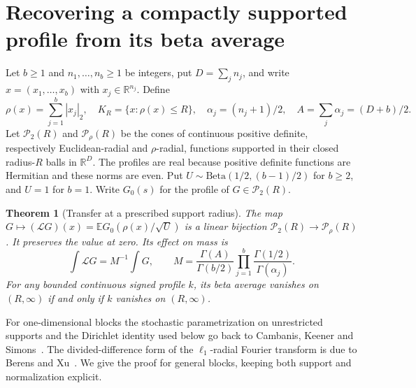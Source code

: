 \documentclass[11pt,a4paper]{article}
\newtheorem{theorem}{Theorem}[section]\newtheorem{lemma}[theorem]{Lemma}\newtheorem{proposition}[theorem]{Proposition}\newtheorem{corollary}[theorem]{Corollary}
\numberwithin{equation}{section}
\newcommand{\R}{\mathbb R}\newcommand{\E}{\mathbb E}\newcommand{\norm}[1]{\left\lVert #1\right\rVert}
\begin{document}
\section{Recovering a compactly supported profile from its beta average}
Let $b\ge1$ and $n_1,\ldots,n_b\ge1$ be integers, put $D=\sum_j n_j$, and write $x=(x_1,\ldots,x_b)$ with $x_j\in\mathbb R^{n_j}$. Define
\[
 \rho(x)=\sum_{j=1}^b |x_j|_2,\quad K_R=\{x:\rho(x)\le R\},\quad
 \alpha_j=(n_j+1)/2,\quad A=\sum_j\alpha_j=(D+b)/2.
\]
Let $\mathcal P_2(R)$ and $\mathcal P_\rho(R)$ be the cones of continuous positive definite, respectively Euclidean-radial and $\rho$-radial, functions supported in their closed radius-$R$ balls in $\R^D$. The profiles are real because positive definite functions are Hermitian and these norms are even. Put $U\sim\mathrm{Beta}(1/2,(b-1)/2)$ for $b\ge2$, and $U=1$ for $b=1$. Write $G_0(s)$ for the profile of $G\in\mathcal P_2(R)$.

\begin{theorem}[Transfer at a prescribed support radius]\label{thm:transfer}
The map $G\mapsto (\mathcal L G)(x)=\E G_0(\rho(x)/\sqrt U)$ is a linear bijection $\mathcal P_2(R)\to\mathcal P_\rho(R)$. It preserves the value at zero. Its effect on mass is
\begin{equation}\label{eq:mass}
 \int \mathcal LG=M^{-1}\int G,\qquad
 M=\frac{\Gamma(A)}{\Gamma(b/2)}\prod_{j=1}^b\frac{\Gamma(1/2)}{\Gamma(\alpha_j)} .
\end{equation}
For any bounded continuous signed profile $k$, its beta average vanishes on $(R,\infty)$ if and only if $k$ vanishes on $(R,\infty)$.
\end{theorem}
For one-dimensional blocks the stochastic parametrization on unrestricted supports and the Dirichlet identity used below go back to Cambanis, Keener and Simons~\cite[Prop.~3.1, Thm.~3.1]{CKS}. The divided-difference form of the $\ell_1$-radial Fourier transform is due to Berens and Xu~\cite[Theorem~A and references]{BB16}. We give the proof for general blocks, keeping both support and normalization explicit.
\end{document}
